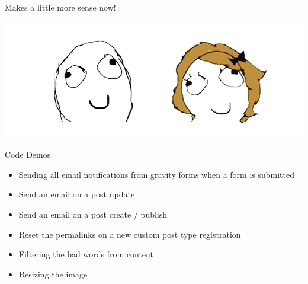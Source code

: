 \documentclass[10pt]{beamer}
\begin{document}
    \begin{frame}
        \begin{center}
            \begin{Huge}
                Makes a little more sense now!
            \end{Huge}

            \vfill{}
            \includegraphics[width=1\textwidth]{images/sense}
        \end{center}
    \end{frame}

    \begin{frame}{Code Demos}
        \begin{itemize}
            \item Sending all email notifications from gravity forms when a form is submitted
            \item Send an email on a post update
            \item Send an email on a post create / publish
            \item Reset the permalinks on a new custom post type registration 
            \item Filtering the bad words from content
            \item Resizing the image
        \end{itemize}
    \end{frame}

    \begin{frame}
        
    \end{frame}

    \begin{frame}
        
    \end{frame}

    \begin{frame}
        
    \end{frame}

    \begin{frame}
        
    \end{frame}
    
\end{document}

